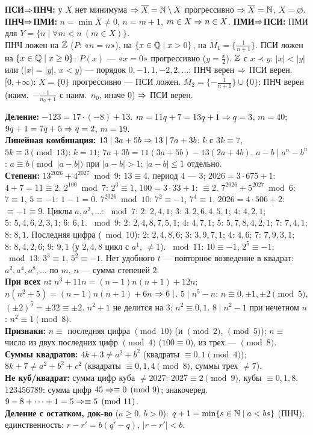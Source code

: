 {
\textbf{ПСИ$\Rightarrow$ПНЧ:} у $X$ нет минимума $\Rightarrow\overline X=\mathbb{N}\setminus X$ прогрессивно $\Rightarrow\overline X=\mathbb{N}$, $X=\varnothing$. \textbf{ПНЧ$\Rightarrow$ПМИ:} $n=\min\overline X\ne0$, $n=m+1$, $m\in X\Rightarrow n\in X$. \textbf{ПМИ$\Rightarrow$ПСИ:} ПМИ для $Y=\{n\mid\forall m<n\ (m\in X)\}$.\\
ПНЧ ложен на $\mathbb{Z}$ ($P$: «$n=n$»), на $\{x\in\mathbb{Q}\mid x>0\}$, на $M_1=\{\frac1{n+1}\}$. ПСИ ложен на $\{x\in\mathbb{Q}\mid x\ge0\}$: $P(x)$ — «$x=0$» прогрессивно ($y=\frac x2$). $\mathbb{Z}$ с $x\prec y$: $|x|<|y|$ или ($|x|=|y|$, $x<y$) — порядок $0,-1,1,-2,2,\dots$: ПНЧ верен $\Rightarrow$ ПСИ верен. $[0,+\infty)$: $X=\{0\}$ прогрессивно — ПСИ ложен. $M_2=\{-\frac1{n+1}\}\cup\{0\}$: ПНЧ верен (наим.\ $-\frac1{n_0+1}$ с наим.\ $n_0$, иначе $0$) $\Rightarrow$ ПСИ верен.

\textbf{Деление:} $-123=17\cdot(-8)+13$. $m=11q+7=13q+1\Rightarrow q=3$, $m=40$; $9q+1=7q+5\Rightarrow q=2$, $m=19$.\\
\textbf{Линейная комбинация:} $13\mid3a+5b\Rightarrow13\mid7a+3b$: $k$ с $3k\equiv7$, $5k\equiv3\pmod{13}$: $k=11$; $7a+3b=11(3a+5b)-13(2a+4b)$. $a-b\mid a^n-b^n$: $a\equiv b\pmod{|a-b|}$ при $|a-b|>1$; $|a-b|\le1$ отдельно.\\
\textbf{Степени:} $13^{2026}+4^{2027}\bmod9$: $13\equiv4$, период $4$ — $3$; $2026=3\cdot675+1$: $4+7=11\equiv2$. $2^{100}\bmod7$: $2^3\equiv1$, $100=3\cdot33+1$: $\equiv2$. $7^{2026}+5^{2027}\bmod6$: $7\equiv1$, $5\equiv-1$: $1-1=0$. $7^{2026}\bmod10$: $7^2\equiv-1$, $7^4\equiv1$, $2026=4\cdot506+2$: $\equiv-1\equiv9$. Циклы $a,a^2,\dots$: $\bmod7$: $2{:}\,2,4,1$; $3{:}\,3,2,6,4,5,1$; $4{:}\,4,2,1$; $5{:}\,5,4,6,2,3,1$; $6{:}\,6,1$. $\bmod9$: $2{:}\,2,4,8,7,5,1$; $4{:}\,4,7,1$; $5{:}\,5,7,8,4,2,1$; $7{:}\,7,4,1$; $8{:}\,8,1$. Последняя цифра ($\bmod10$): $2{:}\,2,4,8,6$; $3{:}\,3,9,7,1$; $4{:}\,4,6$; $7{:}\,7,9,3,1$; $8{:}\,8,4,2,6$; $9{:}\,9,1$ (у $2,4,8$ цикл с $a^1$, $\ne1$). $\bmod11$: $10\equiv-1$, $2^5\equiv-1$; $\bmod13$: $3^3\equiv1$, $5^2\equiv-1$. Нет удобного $t$ — повторное возведение в квадрат: $a^2,a^4,a^8,\dots$ по $m$, $n$ — сумма степеней $2$.\\
\textbf{При всех $n$:} $n^3+11n=(n-1)n(n+1)+12n$; $n(n^2+5)=(n-1)n(n+1)+6n$ $\Rightarrow6\mid$. $5\mid n^5-n$: $n\equiv0,\pm1,\pm2\pmod5$, $(\pm2)^5=\pm32\equiv\pm2$. $n^2+1$ не делится на $3$: $n^2\equiv0,1$. $8\mid n^2-1$ при нечетном $n$: $n^2\equiv1\pmod8$.\\
\textbf{Признаки:} $n\equiv$ последняя цифра $\pmod{10}$ (и $\pmod2$, $\pmod5$); $n\equiv$ число из двух последних цифр $\pmod4$ ($100\equiv0$), из трех — $\pmod8$.\\
\textbf{Суммы квадратов:} $4k+3\ne a^2+b^2$ (квадраты $\equiv0,1\pmod4$); $8k+7\ne a^2+b^2+c^2$ (квадраты $\equiv0,1,4\pmod8$, суммы трех $\ne7$).\\
\textbf{Не куб/квадрат:} сумма цифр куба $\ne2027$: $2027\equiv2\pmod9$, кубы $\equiv0,1,8$. $123456789$: сумма цифр $45\Rightarrow\equiv0\pmod9$; знакочеред.\ $9-8+\dots+1=5\Rightarrow\equiv5\pmod{11}$.\\
\textbf{Деление с остатком, док-во} ($a\ge0$, $b>0$): $q+1=\min\{s\in\mathbb{N}\mid a<bs\}$ (ПНЧ); единственность: $r-r'=b(q'-q)$, $|r-r'|<b$.
}
